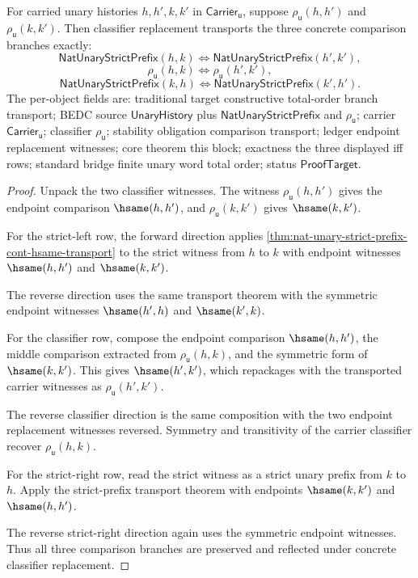 \begin{theorem}
\label{thm:concrete-unary-prefix-totalorder-branch-transport}
For carried unary histories $h,h',k,k'$ in
$\mathsf{Carrier}_{\mathsf{u}}$, suppose
$\rho_{\mathsf{u}}(h,h')$ and $\rho_{\mathsf{u}}(k,k')$. Then classifier
replacement transports the three concrete comparison branches exactly:
$$
\mathsf{NatUnaryStrictPrefix}(h,k)\Longleftrightarrow
\mathsf{NatUnaryStrictPrefix}(h',k'),
$$
$$
\rho_{\mathsf{u}}(h,k)\Longleftrightarrow\rho_{\mathsf{u}}(h',k'),
$$
$$
\mathsf{NatUnaryStrictPrefix}(k,h)\Longleftrightarrow
\mathsf{NatUnaryStrictPrefix}(k',h').
$$
The per-object fields are: traditional target constructive total-order branch
transport; BEDC source $\mathsf{UnaryHistory}$ plus
$\mathsf{NatUnaryStrictPrefix}$ and $\rho_{\mathsf{u}}$; carrier
$\mathsf{Carrier}_{\mathsf{u}}$; classifier $\rho_{\mathsf{u}}$; stability
obligation comparison transport; ledger endpoint replacement witnesses; core
theorem this block; exactness the three displayed iff rows; standard bridge
finite unary word total order; status $\mathsf{ProofTarget}$.
\end{theorem}
\begin{proof}
Unpack the two classifier witnesses. The witness
$\rho_{\mathsf{u}}(h,h')$ gives the endpoint comparison $\hsame(h,h')$, and
$\rho_{\mathsf{u}}(k,k')$ gives $\hsame(k,k')$.

For the strict-left row, the forward direction applies
\autoref{thm:nat-unary-strict-prefix-cont-hsame-transport} to the strict
witness from $h$ to $k$ with endpoint witnesses $\hsame(h,h')$ and
$\hsame(k,k')$.

The reverse direction uses the same transport theorem with the symmetric
endpoint witnesses $\hsame(h',h)$ and $\hsame(k',k)$.

For the classifier row, compose the endpoint comparison $\hsame(h,h')$, the
middle comparison extracted from $\rho_{\mathsf{u}}(h,k)$, and the symmetric
form of $\hsame(k,k')$. This gives $\hsame(h',k')$, which repackages with the
transported carrier witnesses as $\rho_{\mathsf{u}}(h',k')$.

The reverse classifier direction is the same composition with the two endpoint
replacement witnesses reversed. Symmetry and transitivity of the carrier
classifier recover $\rho_{\mathsf{u}}(h,k)$.

For the strict-right row, read the strict witness as a strict unary prefix from
$k$ to $h$. Apply the strict-prefix transport theorem with endpoints
$\hsame(k,k')$ and $\hsame(h,h')$.

The reverse strict-right direction again uses the symmetric endpoint witnesses.
Thus all three comparison branches are preserved and reflected under concrete
classifier replacement.
\end{proof}

